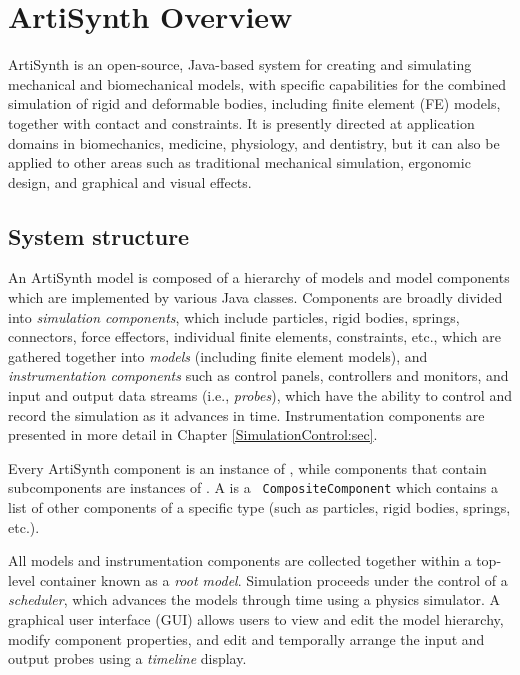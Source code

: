 \ifdefined\maindoc\else
\def\doctitle{ArtiSynth Overview}

\mainmatter
\fi

\chapter{ArtiSynth Overview}
\label{Overview:sec}

ArtiSynth is an open-source, Java-based system for creating and simulating
mechanical and biomechanical models, with specific capabilities for the
combined simulation of rigid and deformable bodies, including finite element
(FE) models, together with contact and constraints. It is presently directed at
application domains in biomechanics, medicine, physiology, and dentistry, but
it can also be applied to other areas such as traditional mechanical
simulation, ergonomic design, and graphical and visual effects.

\section{System structure}

An ArtiSynth model is composed of a hierarchy of models and model components
which are implemented by various Java classes. Components are broadly divided
into {\it simulation components}, which include particles, rigid bodies,
springs, connectors, force effectors, individual finite elements, constraints,
etc., which are gathered together into {\it models} (including finite element
models), and {\it instrumentation components} such as control panels,
controllers and monitors, and input and output data streams (i.e., {\it
probes}), which have the ability to control and record the simulation as it
advances in time.  Instrumentation components are presented in more detail in
Chapter \ref{SimulationControl:sec}.

Every ArtiSynth component is an instance of
, while
components that contain subcomponents are instances of 
.
A  is a {\tt
CompositeComponent} which contains a list of other components of a specific
type (such as particles, rigid bodies, springs, etc.).

All models and instrumentation components are collected together within a
top-level container known as a {\it root model}.  Simulation proceeds under the
control of a {\it scheduler}, which advances the models through time using a
physics simulator. A graphical user interface (GUI) allows users to view and
edit the model hierarchy, modify component properties, and edit and temporally
arrange the input and output probes using a {\it timeline} display.

